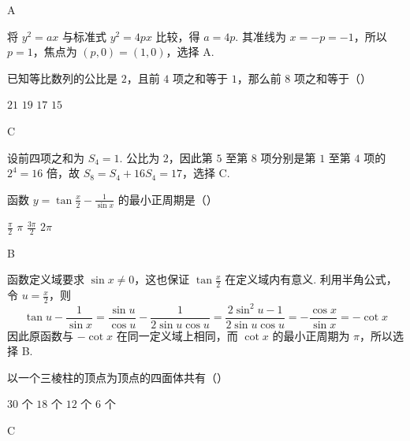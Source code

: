 \documentclass[UTF8,a4paper,oneside,11pt]{ctexbook}
\begin{document}
\begin{answer}
A
\end{answer}

\begin{solution}
将 \(y^2=ax\) 与标准式 \(y^2=4px\) 比较，得 \(a=4p\). 其准线为 \(x=-p=-1\)，所以 \(p=1\)，焦点为 \((p,0)=(1,0)\)，选择 A.
\end{solution}

\begin{problem}
已知等比数列的公比是 \(2\)，且前 \(4\) 项之和等于 \(1\)，那么前 \(8\) 项之和等于（\quad）

\choices
    {\(21\)}
    {\(19\)}
    {\(17\)}
    {\(15\)}
\end{problem}

\begin{answer}
C
\end{answer}

\begin{solution}
设前四项之和为 \(S_4=1\). 公比为 \(2\)，因此第 \(5\) 至第 \(8\) 项分别是第 \(1\) 至第 \(4\) 项的 \(2^4=16\) 倍，故 \(S_8=S_4+16S_4=17\)，选择 C.
\end{solution}

\begin{problem}
函数 \(y=\tan\frac{x}{2}-\frac{1}{\sin x}\) 的最小正周期是（\quad）

\choices
    {\(\frac{\pi}{2}\)}
    {\(\pi\)}
    {\(\frac{3\pi}{2}\)}
    {\(2\pi\)}
\end{problem}

\begin{answer}
B
\end{answer}

\begin{solution}
函数定义域要求 \(\sin x\ne0\)，这也保证 \(\tan\frac{x}{2}\) 在定义域内有意义. 利用半角公式，令 \(u=\frac{x}{2}\)，则
\[
\tan u-\frac{1}{\sin x}=\frac{\sin u}{\cos u}-\frac{1}{2\sin u\cos u}=\frac{2\sin^2u-1}{2\sin u\cos u}=-\frac{\cos x}{\sin x}=-\cot x
\]
因此原函数与 \(-\cot x\) 在同一定义域上相同，而 \(\cot x\) 的最小正周期为 \(\pi\)，所以选择 B.
\end{solution}

\begin{problem}
以一个三棱柱的顶点为顶点的四面体共有（\quad）

\choices
    {\(30\) 个}
    {\(18\) 个}
    {\(12\) 个}
    {\(6\) 个}
\end{problem}

\begin{answer}
C
\end{answer}
\end{document}
